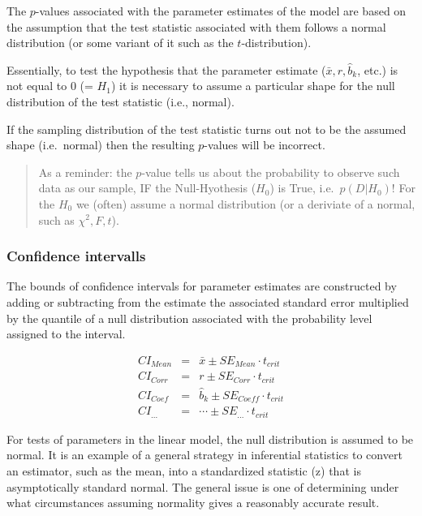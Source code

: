 \documentclass[
]{article}
\begin{document}
The \(p\)-values associated with the parameter estimates of the model are based on the assumption that the test statistic associated with them follows a normal distribution (or some variant of it such as the \(t\)-distribution).

Essentially, to test the hypothesis that the parameter estimate (\(\bar{x}, r, \hat{b}_k\), etc.) is not equal to 0 (= \(H_1\)) it is necessary to assume a particular shape for the null distribution of the test statistic (i.e., normal).

If the sampling distribution of the test statistic turns out not to be the assumed shape (i.e.~normal) then the resulting \(p\)-values will be incorrect.

\begin{quote}
As a reminder: the \(p\)-value tells us about the probability to observe such data as our sample, IF the Null-Hyothesis (\(H_0\)) is True, i.e.~\(p(D|H_0)\)! For the \(H_0\) we (often) assume a normal distribution (or a deriviate of a normal, such as \(\chi^2, F, t\)).
\end{quote}

\subsubsection*{Confidence intervalls}\label{confidence-intervalls}

The bounds of confidence intervals for parameter estimates are constructed by adding or subtracting from the estimate the associated standard error multiplied by the quantile of a null distribution associated with the probability level assigned to the interval.

\[\begin{array}{ccc}
  CI_{Mean} & = & \bar{x} \pm SE_{Mean} \cdot t_{crit}\\
  CI_{Corr} & = & r \pm SE_{Corr} \cdot t_{crit}\\
  CI_{Coef} & = & \hat{b}_k \pm SE_{Coeff} \cdot t_{crit} \\
  CI_{...}  & = & \cdots \pm SE_{...} \cdot t_{crit}
\end{array}\]

For tests of parameters in the linear model, the null distribution is assumed to be normal. It is an example of a general strategy in inferential statistics to convert an estimator, such as the mean, into a standardized statistic (z) that is asymptotically standard normal. The general issue is one of determining under what circumstances assuming normality gives a reasonably accurate result.
\end{document}
